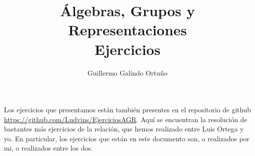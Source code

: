 \documentclass[UTF8]{article}
\begin{document}
\title{Álgebras, Grupos y Representaciones \\
      \large Ejercicios
  }

\author{Guillermo Galindo Ortuño}

\maketitle

Los ejercicios que presentamos están también presentes en el repositorio de github \url{https://github.com/Ludvins/EjerciciosAGR}. Aquí se encuentran la resolución de bastantes más ejercicios de la relación, que hemos realizado entre Luis Ortega y yo. En particular, los ejercicios que están en este documento son, o realizados por mi, o realizados entre los dos.




\end{document}
